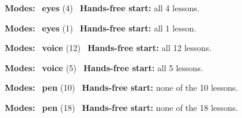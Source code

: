 \expandafter\def\csname hlchaptermodality15\endcsname{%
  {\small\noindent
    \textbf{Modes:} \hlsightsign{}~\textbf{eyes} (4)\quad
    \hlvoicesign{}~\textbf{Hands-free start:} all 4 lessons.%
    \par}\medskip
}

\expandafter\def\csname hlchaptermodality16\endcsname{%
  {\small\noindent
    \textbf{Modes:} \hlsightsign{}~\textbf{eyes} (1)\quad
    \hlvoicesign{}~\textbf{Hands-free start:} all 1 lesson.%
    \par}\medskip
}

\expandafter\def\csname hlchaptermodality17\endcsname{%
  {\small\noindent
    \textbf{Modes:} \hlvoicesign{}~\textbf{voice} (12)\quad
    \hlvoicesign{}~\textbf{Hands-free start:} all 12 lessons.%
    \par}\medskip
}

\expandafter\def\csname hlchaptermodality18\endcsname{%
  {\small\noindent
    \textbf{Modes:} \hlvoicesign{}~\textbf{voice} (5)\quad
    \hlvoicesign{}~\textbf{Hands-free start:} all 5 lessons.%
    \par}\medskip
}

\expandafter\def\csname hlchaptermodality19\endcsname{%
  {\small\noindent
    \textbf{Modes:} \hlpensign{}~\textbf{pen} (10)\quad
    \hlvoicesign{}~\textbf{Hands-free start:} none of the 10 lessons.%
    \par}\medskip
}

\expandafter\def\csname hlchaptermodality20\endcsname{%
  {\small\noindent
    \textbf{Modes:} \hlpensign{}~\textbf{pen} (18)\quad
    \hlvoicesign{}~\textbf{Hands-free start:} none of the 18 lessons.%
    \par}\medskip
}

